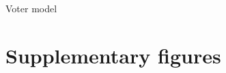 \documentclass[11pt, letterpaper]{article}
\begin{document}
Voter model


\clearpage




\clearpage
\appendix
 
\renewcommand{\theequation}{\thesection.\arabic{equation}}
\setcounter{equation}{0}  %
 
\renewcommand{\thefigure}{S\arabic{figure}}
\setcounter{figure}{0}

\section*{Supplementary figures} 
\end{document}
